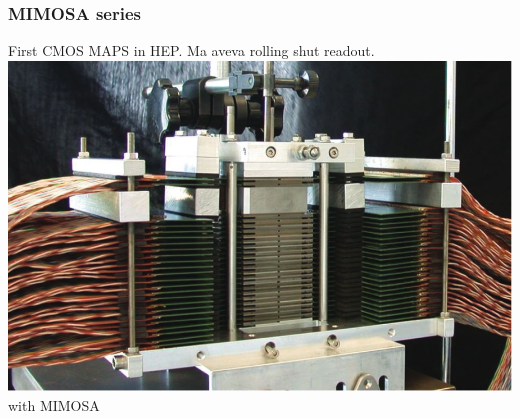     \begin{frame}
        \frametitle{MIMOSA series}
        First CMOS MAPS in HEP. Ma aveva rolling shut readout. 
        \includegraphics[width=.45\linewidth]{figures/pixel_detectors_usage/ALICE_FoCAL.png} with MIMOSA
    \end{frame} 